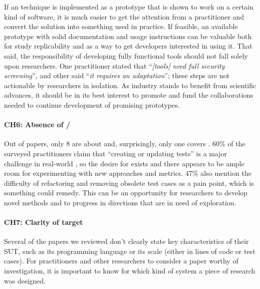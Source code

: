 If an \rt technique is implemented as a prototype that is shown to work on a certain kind of software, it is much easier to get the attention from a practitioner and convert the solution into something used in practice.
If feasible, an available prototype with solid documentation and usage instructions can be valuable both for study replicability and as a way to get developers interested in using it. 
That said, the responsibility of developing fully functional tools should not fall solely upon researchers.
One practitioner stated that ``\textit{[\rt tools] need full security screening}'', and other said ``\textit{it requires an adaptation}''; these steps are not actionable by researchers in isolation.
As industry stands to benefit from scientific advances, it should be in its best interest to promote and fund the collaborations needed to continue development of promising prototypes.


\paragraph{CH6: Absence of \tsr/\tsa}
Out of \numpapers papers, only 8 are about \tsr and, surprisingly, only one covers \tsa 
 .
60\% of the surveyed practitioners claim that ``creating or updating tests'' is a major challenge in real-world \rt, so the desire for \tsa exists and there appears to be ample room for experimenting with new approaches and metrics.
47\% also mention the difficulty of refactoring and removing obsolete test cases as a pain point, which is something \tsr could remedy.
This can be an opportunity for researchers to develop novel methods and to progress in directions that are in need of exploration.

\paragraph{CH7: Clarity of target}
Several of the papers we reviewed don't clearly state key characteristics of their SUT, such as its programming language or its scale (either in lines of code or test cases).
For practitioners and other researchers to consider a paper worthy of investigation, it is important to know for which kind of system a piece of research was designed.


